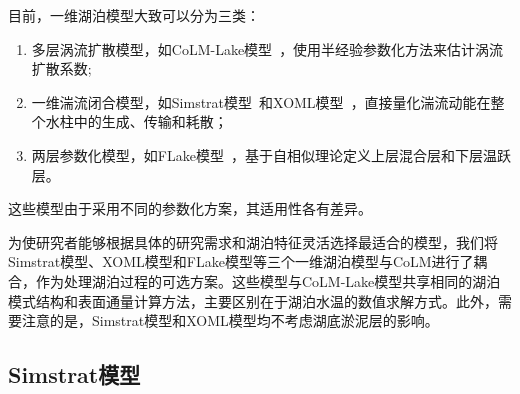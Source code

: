 目前，一维湖泊模型大致可以分为三类：
\begin{enumerate}
  \item 多层涡流扩散模型，如CoLM-Lake模型~\citep{daiLakeSchemeCommon2018}，使用半经验参数化方法来估计涡流扩散系数;
  \item 一维湍流闭合模型，如Simstrat模型~\citep{goudsmit2002application}和XOML模型~\citep{ling2015multilevel}，直接量化湍流动能在整个水柱中的生成、传输和耗散；
  \item 两层参数化模型，如FLake模型~\citep{mironovCOSMOTechnicalReport2008a}，基于自相似理论定义上层混合层和下层温跃层。
\end{enumerate}
这些模型由于采用不同的参数化方案，其适用性各有差异。

为使研究者能够根据具体的研究需求和湖泊特征灵活选择最适合的模型，我们将Simstrat模型、XOML模型和FLake模型等三个一维湖泊模型与CoLM进行了耦合，作为处理湖泊过程的可选方案。这些模型与CoLM-Lake模型共享相同的湖泊模式结构和表面通量计算方法，主要区别在于湖泊水温的数值求解方式。此外，需要注意的是，Simstrat模型和XOML模型均不考虑湖底淤泥层的影响。
%
\subsection{Simstrat模型}\label{Simstrat模型}
\label{Simstrat Model}

